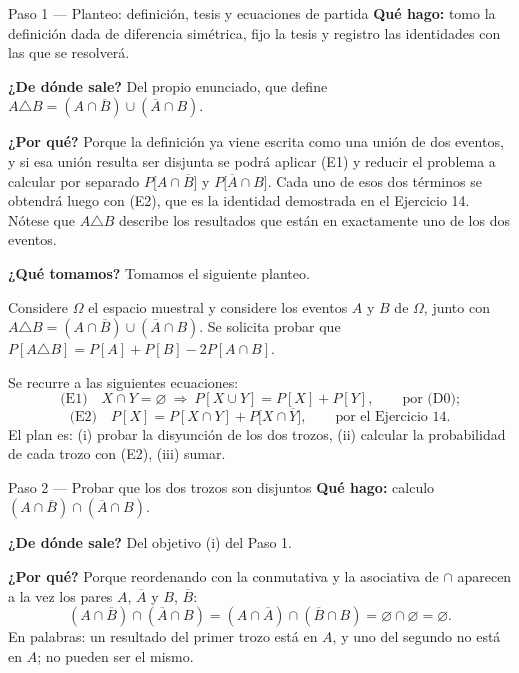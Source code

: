\documentclass[11pt]{article}
\begin{document}
\begin{sol}

\begin{paso}{Paso 1 --- Planteo: definición, tesis y ecuaciones de partida}
\textbf{Qué hago:} tomo la definición dada de diferencia simétrica, fijo la tesis y registro las
identidades con las que se resolverá.

\textbf{¿De dónde sale?} Del propio enunciado, que define
$A\triangle B=(A\cap\overline{B})\cup(\overline{A}\cap B)$.

\textbf{¿Por qué?} Porque la definición ya viene escrita como una unión de dos eventos, y si esa
unión resulta ser disjunta se podrá aplicar (E1) y reducir el problema a calcular por separado
$P\big[A\cap\overline{B}\big]$ y $P\big[\overline{A}\cap B\big]$. Cada uno de esos dos términos
se obtendrá luego con (E2), que es la identidad demostrada en el Ejercicio 14. Nótese que
$A\triangle B$ describe los resultados que están en exactamente uno de los dos eventos.

\textbf{¿Qué tomamos?} Tomamos el siguiente planteo.

\medskip
Considere $\Omega$ el espacio muestral y considere los eventos $A$ y $B$ de $\Omega$, junto con
$A\triangle B=(A\cap\overline{B})\cup(\overline{A}\cap B)$. Se solicita probar que
$P[A\triangle B]=P[A]+P[B]-2P[A\cap B]$.

\medskip
Se recurre a las siguientes ecuaciones:
\[
\text{(E1)}\quad X\cap Y=\varnothing\ \Longrightarrow\ P[X\cup Y]=P[X]+P[Y],\qquad\text{por (D0);}
\]
\[
\text{(E2)}\quad P[X]=P[X\cap Y]+P\big[X\cap\overline{Y}\big],\qquad\text{por el Ejercicio 14.}
\]
El plan es: (i) probar la disyunción de los dos trozos, (ii) calcular la probabilidad de cada
trozo con (E2), (iii) sumar.
\end{paso}

\begin{paso}{Paso 2 --- Probar que los dos trozos son disjuntos}
\textbf{Qué hago:} calculo $(A\cap\overline{B})\cap(\overline{A}\cap B)$.

\textbf{¿De dónde sale?} Del objetivo (i) del Paso 1.

\textbf{¿Por qué?} Porque reordenando con la conmutativa y la asociativa de $\cap$ aparecen a la
vez los pares $A$, $\overline{A}$ y $B$, $\overline{B}$:
\[
(A\cap\overline{B})\cap(\overline{A}\cap B)
=(A\cap\overline{A})\cap(\overline{B}\cap B)
=\varnothing\cap\varnothing
=\varnothing .
\]
En palabras: un resultado del primer trozo está en $A$, y uno del segundo no está en $A$; no
pueden ser el mismo.


\end{paso}
\end{sol}
\end{document}
